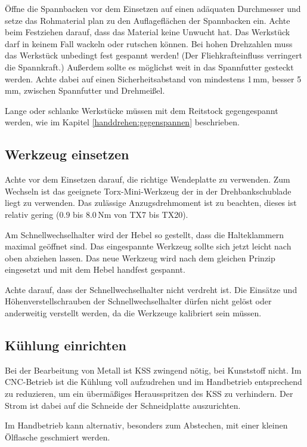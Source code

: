 \documentclass{\basedir/fablab-document}
\begin{document}
Öffne die Spannbacken vor dem Einsetzen auf einen adäquaten Durchmesser und setze das Rohmaterial
plan zu den Auflageflächen der Spannbacken ein.
Achte beim Festziehen darauf, dass das Material keine Unwucht hat.
Das Werkstück darf in keinem Fall wackeln oder rutschen können.
Bei hohen Drehzahlen muss das Werkstück unbedingt fest gespannt werden!
(Der Fliehkrafteinfluss verringert die Spannkraft.)
Außerdem sollte es möglichst weit in das Spannfutter gesteckt werden.
Achte dabei auf einen Sicherheitsabstand von mindestens 1\,mm, besser 5\,mm, zwischen Spannfutter und Drehmeißel.

Lange oder schlanke Werkstücke müssen mit dem Reitstock gegengespannt werden,
wie im Kapitel \ref{handdrehen:gegenspannen} beschrieben.

\subsection{Werkzeug einsetzen} %
Achte vor dem Einsetzen darauf, die richtige Wendeplatte zu verwenden. Zum Wechseln ist das geeignete Torx-Mini-Werkzeug der in der Drehbankschublade liegt zu verwenden. Das zulässige Anzugsdrehmoment ist zu beachten, dieses ist relativ gering ($0.9$ bis $8.0$\,Nm von TX7 bis TX20).

Am Schnellwechselhalter wird der Hebel so gestellt, dass die Halteklammern maximal geöffnet sind.
Das eingespannte Werkzeug sollte sich jetzt leicht nach oben abziehen lassen.
Das neue Werkzeug wird nach dem gleichen Prinzip eingesetzt und mit dem Hebel handfest gespannt.

Achte darauf, dass der Schnellwechselhalter nicht verdreht ist. Die Einsätze und Höhenverstellschrauben der Schnellwechselhalter dürfen nicht gelöst oder anderweitig verstellt werden, da die Werkzeuge kalibriert sein müssen.

\subsection{Kühlung einrichten}

Bei der Bearbeitung von Metall ist KSS zwingend nötig, bei Kunststoff nicht.
Im CNC-Betrieb ist die Kühlung voll aufzudrehen und im Handbetrieb entsprechend zu reduzieren,
um ein übermäßiges Herausspritzen des KSS zu verhindern.
Der Strom ist dabei auf die Schneide der Schneidplatte auszurichten.

Im Handbetrieb kann alternativ, besonders zum Abstechen, mit einer kleinen Ölflasche geschmiert werden. 
\end{document}
